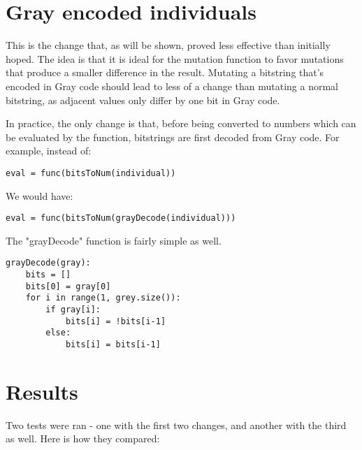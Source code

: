 \documentclass{article}
\begin{document}
    \section{Gray encoded individuals}
    This is the change that, as will be shown, proved less effective than initially hoped. The idea is that it is ideal for the mutation function to favor mutations that produce a smaller difference in the result. Mutating a bitstring that's encoded in Gray code should lead to less of a change than mutating a normal bitstring, as adjacent values only differ by one bit in Gray code.

    In practice, the only change is that, before being converted to numbers which can be evaluated by the function, bitstrings are first decoded from Gray code. For example, instead of:

    \begin{verbatim}
eval = func(bitsToNum(individual))
    \end{verbatim}

    We would have:

    \begin{verbatim}
eval = func(bitsToNum(grayDecode(individual)))
    \end{verbatim}

    The "grayDecode" function is fairly simple as well.
    
    \begin{verbatim}
grayDecode(gray):
    bits = []
    bits[0] = gray[0]
    for i in range(1, grey.size()):
        if gray[i]:
            bits[i] = !bits[i-1]
        else:
            bits[i] = bits[i-1]
    \end{verbatim}
\newpage
    \section{Results}
    Two tests were ran - one with the first two changes, and another with the third as well. Here is how they compared:
\end{document}
